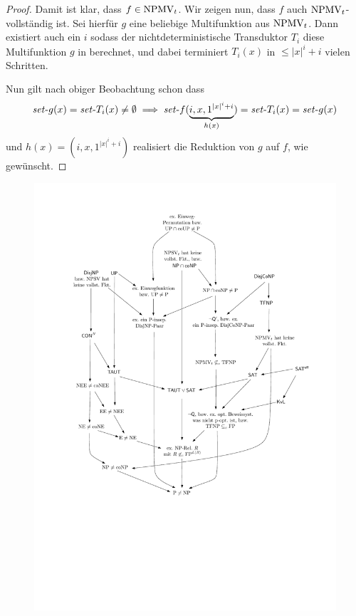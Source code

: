 \begin{proof}
    Damit ist klar, dass $f\in\mathrm{NPMV}_t$.
    Wir zeigen nun, dass $f$ auch $\mathrm{NPMV}_t$-vollständig ist.
    Sei hierfür $g$ eine beliebige Multifunktion aus $\mathrm{NPMV}_t$.
    Dann existiert auch ein $i$ sodass der  nichtdeterministische Transduktor $T_i$ diese Multifunktion $g$ in berechnet, und dabei terminiert $T_i(x)$ in $\leq |x|^i+i$ vielen Schritten.

    Nun gilt nach obiger Beobachtung schon dass 
    \[ \mathit{set}\text{-}{g}(x) = \mathit{set}\text{-}{T_i}(x)\neq\emptyset \implies \mathit{set}\text{-}{f}(\underbrace{i, x, 1^{|x|^i+i}}_{h(x)})=\mathit{set}\text{-}{T_i}(x)=\mathit{set}\text{-}{g}(x) \]
    und $h(x)=(i, x, 1^{|x|^i+i})$ realisiert die Reduktion von $g$ auf $f$, wie gewünscht.
\end{proof}

\begin{figure}
    \centering\includegraphics[page=7]{figures.pdf}
    \caption{}
\end{figure}



